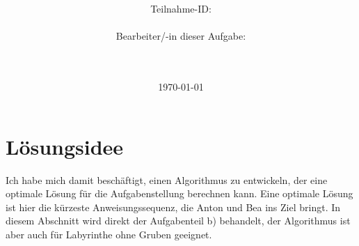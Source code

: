 \documentclass[a4paper,10pt,ngerman]{scrartcl}
\title{\textbf{\Huge\Aufgabe}}
\author{\LARGE Teilnahme-ID: \LARGE \TeilnahmeId \\\\
\LARGE Bearbeiter/-in dieser Aufgabe: \\
\LARGE \Name\\\\}
\date{\LARGE\today}
\begin{document}
    \maketitle
    \tableofcontents

    \vspace{0.5cm}


    \section{Lösungsidee}
    Ich habe mich damit beschäftigt, einen Algorithmus zu entwickeln, der eine optimale Lösung für die Aufgabenstellung berechnen kann.
    Eine optimale Lösung ist hier die kürzeste Anweisungssequenz, die Anton und Bea ins Ziel bringt.
    In diesem Abschnitt wird direkt der Aufgabenteil b) behandelt, der Algorithmus ist aber auch für Labyrinthe ohne Gruben geeignet.
\end{document}
